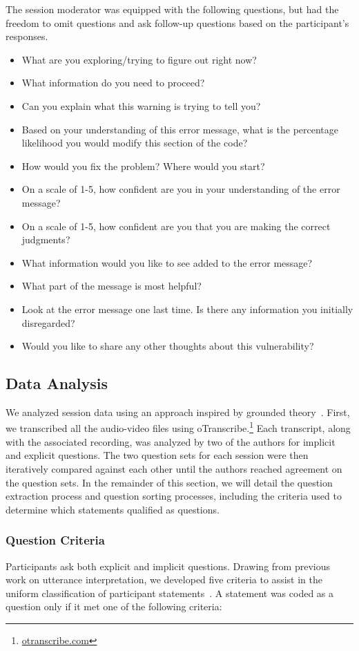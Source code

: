 \documentclass[conference]{IEEEtran}
\begin{document}
The session moderator was equipped with the following questions, but had the freedom to omit questions and ask follow-up questions based on the participant's responses.
\begin{itemize}
\item What are you exploring/trying to figure out right now?
\item What information do you need to proceed?
\item Can you explain what this warning is trying to tell you?
\item Based on your understanding of this error message, what is the percentage likelihood you would modify this section of the code?
\item How would you fix the problem? Where would you start?
\item On a scale of 1-5, how confident are you in your understanding of the error message?
\item On a scale of 1-5, how confident are you that you are making the correct judgments?
\item What information would you like to see added to the error message?
\item What part of the message is most helpful?
\item Look at the error message one last time. Is there any information you initially disregarded?
\item Would you like to share any other thoughts about this vulnerability?
\end{itemize}

\subsection{Data Analysis}
\label{dataAnalysis}
We analyzed session data using an approach inspired by grounded theory~\cite{glaser2009discovery}. 
First, we transcribed all the audio-video files using oTranscribe.\footnote{\url{otranscribe.com}}
Each transcript, along with the associated recording, was analyzed by two of the authors for implicit and explicit questions. 
The two question sets for each session were then iteratively compared against each other until the authors reached agreement on the question sets. 
In the remainder of this section, we will detail the question extraction process and question sorting processes, including the criteria used to determine which statements qualified as questions.
\subsubsection{Question Criteria}
Participants ask both explicit and implicit questions. 
Drawing from previous work on utterance interpretation, we developed five criteria to assist in the uniform classification of participant statements~\cite{letovsky1987cognitive}. 
A statement was coded as a question only if it met one of the following criteria:
\end{document}
